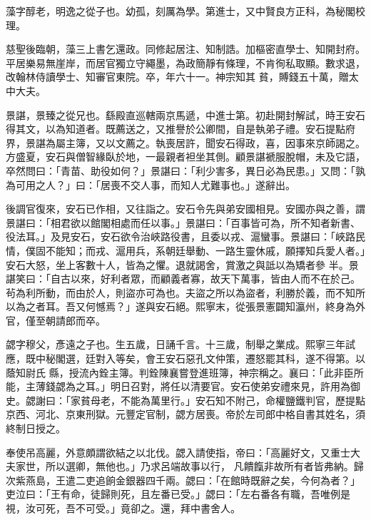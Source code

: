 \begin{pinyinscope}
 藻字醇老，明逸之從子也。幼孤，刻厲為學。第進士，又中賢良方正科，為秘閣校理。



 慈聖後臨朝，藻三上書乞還政。同修起居注、知制誥。加樞密直學士、知開封府。平居樂易無崖岸，而居官獨立守繩墨，為政簡靜有條理，不肯徇私取顯。數求退，改翰林侍讀學士、知審官東院。卒，年六十一。神宗知其
 貧，賻錢五十萬，贈太中大夫。



 景諶，景臻之從兄也。繇殿直巡轄兩京馬遞，中進士第。初赴開封解試，時王安石得其文，以為知道者。既薦送之，又推譽於公卿間，自是執弟子禮。安石提點府界，景諶為屬主簿，又以文薦之。執喪居許，聞安石得政，喜，因事來京師謁之。方盛夏，安石與僧智緣臥於地，一最親者袒坐其側。顧景諶褫服脫帽，未及它語，卒然問曰：「青苗、助役如何？」景諶曰：「利少害多，異日必為民患。」又問：「孰
 為可用之人？」曰：「居喪不交人事，而知人尤難事也。」遂辭出。



 後調官復來，安石已作相，又往詣之。安石令先與弟安國相見。安國亦與之善，謂景諶曰：「相君欲以館閣相處而任以事。」景諶曰：「百事皆可為，所不知者新書、役法耳。」及見安石，安石欲令治峽路役書，且委以戎、滬蠻事。景諶曰：「峽路民情，僕固不能知；而戎、滬用兵，系朝廷舉動、一路生靈休戚，願擇知兵愛人者。」安石大怒，坐上客數十人，皆為之懼。退就謁舍，賞激之與詆以為矯者參
 半。景諶笑曰：「自古以來，好利者眾，而顧義者寡，故天下萬事，皆由人而不在於己。茍為利所動，而由於人，則盜亦可為也。夫盜之所以為盜者，利勝於義，而不知所以為之者耳。吾又何憾焉？」遂與安石絕。熙寧末，從張景憲闢知瀛州，終身為外官，僅至朝請郎而卒。



 勰字穆父，彥遠之子也。生五歲，日誦千言。十三歲，制舉之業成。熙寧三年試應，既中秘閣選，廷對入等矣，會王安石惡孔文仲策，遷怒罷其科，遂不得第。以蔭知尉氏
 縣，授流內銓主簿。判銓陳襄嘗登進班簿，神宗稱之。襄曰：「此非臣所能，主薄錢勰為之耳。」明日召對，將任以清要官。安石使弟安禮來見，許用為御史。勰謝曰：「家貧母老，不能為萬里行。」安石知不附己，命權鹽鐵判官，歷提點京西、河北、京東刑獄。元豐定官制，勰方居喪。帝於左司郎中格自書其姓名，須終制日授之。



 奉使吊高麗，外意頗謂欲結之以北伐。勰入請使指，帝曰：「高麗好文，又重士大夫家世，所以選卿，無他也。」乃求呂端故事以行，
 凡饋餼非故所有者皆弗納。歸次紫燕島，王遣二吏追餉金銀器四千兩。勰曰：「在館時既辭之矣，今何為者？」吏泣曰：「王有命，徒歸則死，且左番已受。」勰曰：「左右番各有職，吾唯例是視，汝可死，吾不可受。」竟卻之。還，拜中書舍人。




\end{pinyinscope}
